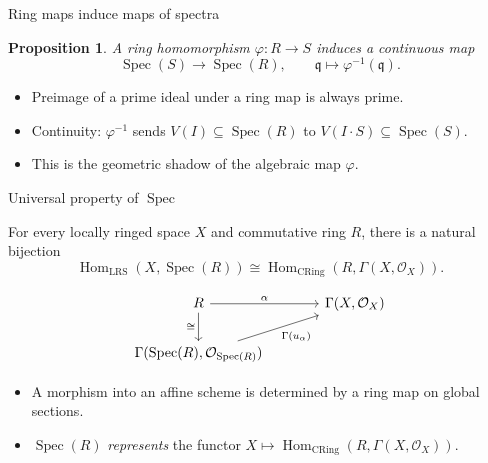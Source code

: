 \documentclass[10pt, aspectratio=169]{beamer}
\DeclareMathOperator{\Spec}{Spec}
\DeclareMathOperator{\Hom}{Hom}
\newcommand{\OO}{\mathcal{O}}
\newcommand{\CRing}{\mathrm{CRing}}
\newcommand{\LRS}{\mathrm{LRS}}
\newtheorem{proposition}[theorem]{Proposition}
\begin{document}
\begin{frame}{Ring maps induce maps of spectra}
    \begin{proposition}
        A ring homomorphism $\varphi : R \to S$ induces a continuous map
        \[
        \Spec(S) \longrightarrow \Spec(R),
        \qquad \mathfrak q \longmapsto \varphi^{-1}(\mathfrak q).
        \]
    \end{proposition}
    \begin{itemize}
        \item Preimage of a prime ideal under a ring map is always prime.
        \item Continuity: $\varphi^{-1}$ sends $V(I) \subseteq \Spec(R)$ to $V(I \cdot S) \subseteq \Spec(S)$.
        \item This is the geometric shadow of the algebraic map $\varphi$.
    \end{itemize}
\end{frame}

\begin{frame}[fragile]{Universal property of $\Spec$}
    \begin{theorem}
        For every locally ringed space $X$ and commutative ring $R$, there is a natural bijection
        \[
        \boxed{\Hom_{\LRS}(X,\Spec(R))\cong \Hom_{\CRing}(R,\Gamma(X,\OO_X)).}
        \]
    \end{theorem}
    \[
    \begin{tikzcd}[column sep=large]
        R \arrow[r, "\alpha"] \arrow[d, "\cong"'] & \Gamma(X,\OO_X) \\
        \Gamma(\Spec(R),\OO_{\Spec(R)}) \arrow[ur, "\Gamma(u_\alpha)"'] &
    \end{tikzcd}
    \]
    \begin{itemize}
        \item A morphism into an affine scheme is determined by a ring map on global sections.
        \item $\Spec(R)$ \emph{represents} the functor $X \mapsto \Hom_{\CRing}(R, \Gamma(X,\OO_X))$.
    \end{itemize}
\end{frame}
\end{document}

